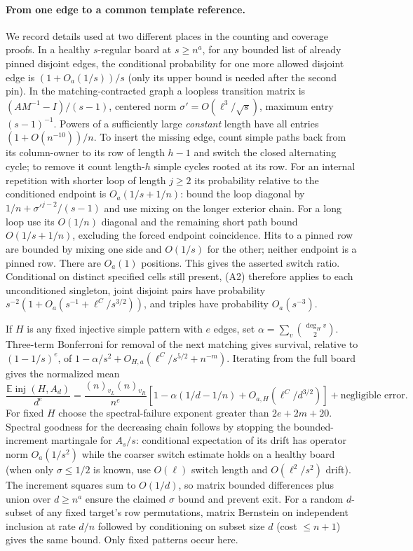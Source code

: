 \paragraph{From one edge to a common template reference.}
We record details used at two different places in the counting and coverage proofs. In a healthy $s$-regular board at $s\ge n^a$, for any bounded list of already pinned disjoint edges, the conditional probability for one more allowed disjoint edge is $(1+O_a(1/s))/s$ (only its upper bound is needed after the second pin). In the matching-contracted graph a loopless transition matrix is $(A M^{-1}-I)/(s-1)$, centered norm $\sigma'=O(\ell^3/\sqrt s)$, maximum entry $(s-1)^{-1}$. Powers of a sufficiently large \emph{constant} length have all entries $(1+O(n^{-10}))/n$. To insert the missing edge, count simple paths back from its column-owner to its row of length $h-1$ and switch the closed alternating cycle; to remove it count length-$h$ simple cycles rooted at its row. For an internal repetition with shorter loop of length $j\ge2$ its probability relative to the conditioned endpoint is $O_a(1/s+1/n)$: bound the loop diagonal by $1/n+\sigma'^{j-2}/(s-1)$ and use mixing on the longer exterior chain. For a long loop use its $O(1/n)$ diagonal and the remaining short path bound $O(1/s+1/n)$, excluding the forced endpoint coincidence. Hits to a pinned row are bounded by mixing one side and $O(1/s)$ for the other; neither endpoint is a pinned row. There are $O_a(1)$ positions. This gives the asserted switch ratio. Conditional on distinct specified cells still present, (A2) therefore applies to each unconditioned singleton, joint disjoint pairs have probability $s^{-2}(1+O_a(s^{-1}+\ell^C/s^{3/2}))$, and triples have probability $O_a(s^{-3})$.

If $H$ is any fixed injective simple pattern with $e$ edges, set $\alpha=\sum_v\binom{\deg_H v}{2}$. Three-term Bonferroni for removal of the next matching gives survival, relative to $(1-1/s)^e$, of
$1-\alpha/s^2+O_{H,a}(\ell^C/s^{5/2}+n^{-m})$. Iterating from the full board gives the normalized mean
\[
 \frac{\mathbb E\operatorname{inj}(H,A_d)}{d^e}
 =\frac{(n)_{v_L}(n)_{v_R}}{n^e}
 \left[1-\alpha(1/d-1/n)+O_{a,H}(\ell^C/d^{3/2})\right]
 +\text{negligible error}.
\]
For fixed $H$ choose the spectral-failure exponent greater than $2e+2m+20$. Spectral goodness for the decreasing chain follows by stopping the bounded-increment martingale for $A_s/s$: conditional expectation of its drift has operator norm $O_a(1/s^2)$ while the coarser switch estimate holds on a healthy board (when only $\sigma\le1/2$ is known, use $O(\ell)$ switch length and $O(\ell^2/s^2)$ drift). The increment squares sum to $O(1/d)$, so matrix bounded differences plus union over $d\ge n^a$ ensure the claimed $\sigma$ bound and prevent exit. For a random $d$-subset of any fixed target's row permutations, matrix Bernstein on independent inclusion at rate $d/n$ followed by conditioning on subset size $d$ (cost $\le n+1$) gives the same bound. Only fixed patterns occur here.

